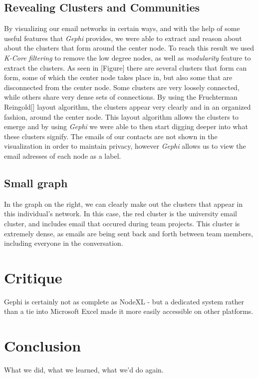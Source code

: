 \documentclass[11pt,letterpaper]{article}
\begin{document}
\subsection*{Revealing Clusters and Communities}

By visualizing our email networks in certain ways, and with the help of some useful features that \textit{Gephi} provides, we were able to extract and reason about about the clusters that form around the center node. To reach this result we used \textit{K-Core filtering} to remove the low degree nodes, as well as \textit{modularity} feature to extract the clusters. As seen in [Figure] there are several clusters that form can form, some of which the center node takes place in, but also some that are disconnected from the center node. Some clusters are very loosely connected, while others share very dense sets of connections. By using the Fruchterman Reingold[] layout algorithm, the clusters appear very clearly and in an organized fashion, around the center node. This layout algorithm allows the clusters to emerge and by using \textit{Gephi} we were able to then start digging deeper into what these clusters signify. The emails of our contacts are not shown in the visualization in order to maintain privacy, however \textit{Gephi} allows us to view the email adresses of each node as a label.

\subsection*{Small graph}
In the graph on the right, we can clearly make out the clusters that appear in this individual's network. In this case, the red cluster is the university email cluster, and includes email that occured during team projects. This cluster is extremely dense, as emails are being sent back and forth between team members, including everyone in the conversation.


\section*{Critique}

Gephi is certainly not as complete as NodeXL - but a dedicated system rather than a tie into Microsoft Excel made it more easily accessible on other platforms.

\section*{Conclusion}

What we did, what we learned, what we'd do again.



\end{document}
